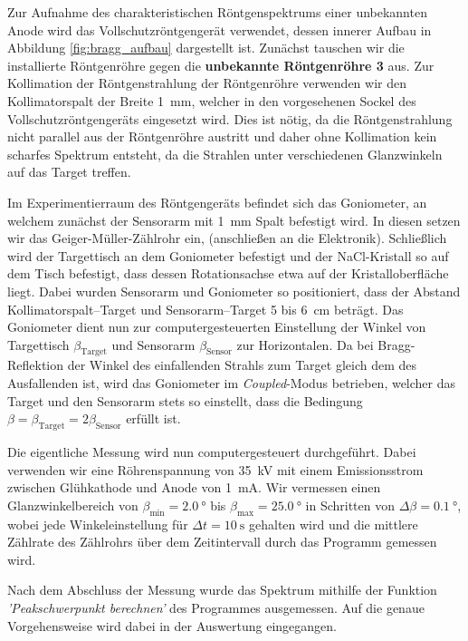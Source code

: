 \documentclass[10pt, a4paper]{article}
\begin{document}
Zur Aufnahme des charakteristischen Röntgenspektrums einer unbekannten Anode wird das Vollschutzröntgengerät verwendet, dessen innerer Aufbau in Abbildung \ref{fig:bragg_aufbau} dargestellt ist.
Zunächst tauschen wir die installierte Röntgenröhre gegen die \textbf{unbekannte Röntgenröhre 3} aus.
Zur Kollimation der Röntgenstrahlung der Röntgenröhre verwenden wir den Kollimatorspalt der Breite \SI{1}{\milli\metre}, welcher in den vorgesehenen Sockel des Vollschutzröntgengeräts eingesetzt wird.
Dies ist nötig, da die Röntgenstrahlung nicht parallel aus der Röntgenröhre austritt und daher ohne Kollimation kein scharfes Spektrum entsteht, da die Strahlen unter verschiedenen Glanzwinkeln auf das Target treffen.

Im Experimentierraum des Röntgengeräts befindet sich das Goniometer, an welchem zunächst der Sensorarm mit \SI{1}{\milli\metre} Spalt befestigt wird.
In diesen setzen wir das Geiger-Müller-Zählrohr ein, (anschließen an die Elektronik).
Schließlich wird der Targettisch an dem Goniometer befestigt und der NaCl-Kristall so auf dem Tisch befestigt, dass dessen Rotationsachse etwa auf der Kristalloberfläche liegt.
Dabei wurden Sensorarm und Goniometer so positioniert, dass der Abstand Kollimatorspalt--Target und Sensorarm--Target \num{5} bis \SI{6}{\centi\metre} beträgt.
Das Goniometer dient nun zur computergesteuerten Einstellung der Winkel von Targettisch $\beta_\mathrm{Target}$ und Sensorarm $\beta_\mathrm{Sensor}$ zur Horizontalen.
Da bei Bragg-Reflektion der Winkel des einfallenden Strahls zum Target gleich dem des Ausfallenden ist, wird das Goniometer im \emph{Coupled}-Modus betrieben, welcher das Target und den Sensorarm stets so einstellt, dass die Bedingung $\beta = \beta_\mathrm{Target} = 2\beta_\mathrm{Sensor}$ erfüllt ist.

Die eigentliche Messung wird nun computergesteuert durchgeführt.
Dabei verwenden wir eine Röhrenspannung von \SI{35}{\kilo\volt} mit einem Emissionsstrom zwischen Glühkathode und Anode von \SI{1}{\milli\ampere}.
Wir vermessen einen Glanzwinkelbereich von $\beta_\mathrm{min} = \SI{2,0}{\degree}$ bis $\beta_\mathrm{max} = \SI{25,0}{\degree}$ in Schritten von $\Delta \beta = \SI{0,1}{\degree}$, wobei jede Winkeleinstellung für $\Delta t = \SI{10}{\second}$ gehalten wird und die mittlere Zählrate des Zählrohrs über dem Zeitintervall durch das Programm gemessen wird.

Nach dem Abschluss der Messung wurde das Spektrum mithilfe der Funktion \emph{'Peakschwerpunkt berechnen'} des Programmes ausgemessen. Auf die genaue Vorgehensweise wird dabei in der Auswertung eingegangen.
\end{document}
